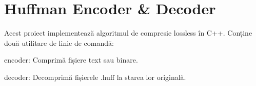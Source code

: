 \chapter{Huffman Encoder \& Decoder }
\hypertarget{md__r_e_a_d_m_e}{}\label{md__r_e_a_d_m_e}
\label{md__r_e_a_d_m_e_autotoc_md0}%
%


Acest proiect implementează algoritmul de compresie lossless  în C++. Conține două utilitare de linie de comandă:\+
\begin{DoxyItemize}
\item {\ttfamily encoder}:\+ Comprimă fișiere text sau binare.
\item {\ttfamily decoder}:\+ Decomprimă fișierele {\ttfamily .huff} la starea lor originală. 
\end{DoxyItemize}
